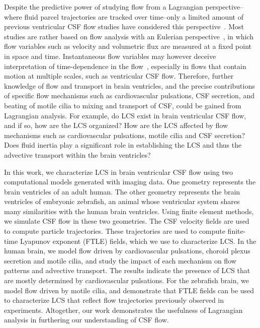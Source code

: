 \documentclass{template}
\begin{document}
Despite the predictive power of studying flow from a
Lagrangian perspective--where fluid parcel trajectories are tracked over time--only
a limited amount of previous ventricular CSF flow studies
have considered this perspective~\citep{Yoshida2022EffectVentricles}.
Most studies are rather based on flow analysis with an
Eulerian perspective~\citep{Kurtcuoglu2007ComputationalSylvius,
Causemann2022HumanFramework, howden2008three, Sweetman2011ThreeDimensional,
Siyahhan2014FlowVentricles},
in which flow variables such as velocity and volumetric flux
are measured at a fixed point in space and time.
Instantaneous flow variables may however deceive
interpretation of time-dependence in the flow~\citep{shadden2005definition},
especially in flows that contain motion at multiple scales,
such as ventricular CSF flow. Therefore,
further knowledge of flow and transport in brain ventricles,
and the precise contributions of specific
flow mechanisms such as cardiovascular pulsations, CSF secretion,
and beating of motile cilia to mixing and transport of CSF,
could be gained from Lagrangian analysis.
For example, do LCS exist in brain ventricular CSF flow,
and if so, how are the LCS organized?
How are the LCS affected by flow mechanisms
such as cardiovascular pulsations, motile cilia and CSF secretion?
Does fluid inertia play a significant role in establishing the
LCS and thus the advective transport within the brain ventricles?

In this work, we characterize LCS in brain ventricular CSF flow
using two computational models generated with imaging data.
One geometry represents the brain ventricles of an adult human. The other
geometry represents the brain ventricles of embryonic zebrafish, an animal whose
ventricular system shares many similarities with the human brain ventricles.
Using finite element methods, we simulate CSF flow
in these two geometries. The CSF velocity fields are used to
compute particle trajectories. These trajectories are used to
compute finite-time Lyapunov exponent (FTLE) fields, which
we use to characterize LCS. In the human brain, we model
flow driven by cardiovascular pulsations, choroid plexus secretion and motile cilia,
and study the impact of each mechanism on flow patterns and advective transport.
The results indicate the presence of LCS that are mostly determined
by cardiovascular pulsations. For the zebrafish brain, we model flow
driven by motile cilia, and demonstrate that FTLE fields can be
used to characterize LCS that reflect flow trajectories
previously observed in experiments. Altogether, our work demonstrates the usefulness of
Lagrangian analysis in furthering our understanding of CSF flow.
\end{document}
